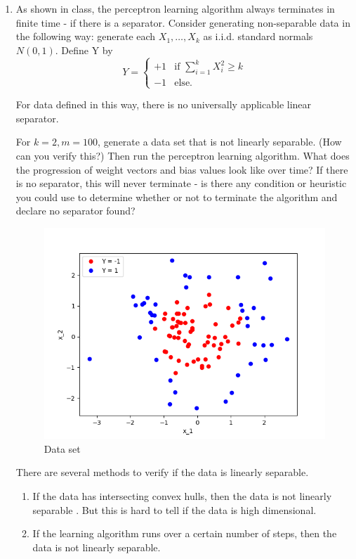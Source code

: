 \documentclass[letter, 12pt]{article}
\begin{document}
\begin{enumerate}
        \item {As shown in class, the perceptron learning algorithm always terminates in finite time - if there is a separator.
            Consider generating non-separable data in the following way: generate each $ X_1 , \dots , X_k $ as i.i.d. standard
            normals $ N (0, 1) $. Define Y by \[ Y = \begin{cases}
            +1 & \text{if } \sum_{i=1}^{k}X_i^2 \ge k \\
            -1 & \text{else}.
            \end{cases} \]}
        \par{For data defined in this way, there is no universally applicable linear separator.}
        \par{For $ k = 2, m = 100 $, generate a data set that is not linearly separable. (How can you verify this?) Then run
            the perceptron learning algorithm. What does the progression of weight vectors and bias values look like over
            time? If there is no separator, this will never terminate - is there any condition or heuristic you could use to
            determine whether or not to terminate the algorithm and declare no separator found?}
        \begin{figure}[H]
	        \centering
	        \includegraphics[width=.7\textwidth]{q5.png}
	        \caption{Data set}
	        \label{q5}
	    \end{figure}
    	\par{There are several methods to verify if the data is linearly separable.}
    	\begin{enumerate}
    		\item{If the data has intersecting convex hulls, then the data is not linearly separable \cite{holmes}. But this is hard to tell if the data is high dimensional.}
    		\item{If the learning algorithm runs over a certain number of steps, then the data is not linearly separable.}

\end{enumerate}
\end{enumerate}
\end{document}
